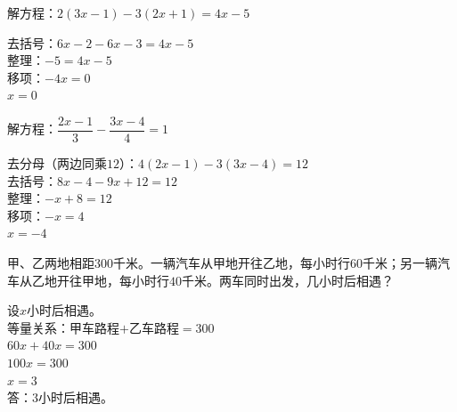\documentclass[a4paper,12pt]{ctexart}
\begin{document}

\begin{example}
解方程：$2(3x-1)-3(2x+1)=4x-5$
\end{example}
\begin{solution}
去括号：$6x-2-6x-3=4x-5$\\
整理：$-5=4x-5$\\
移项：$-4x=0$\\
$x=0$
\end{solution}

\begin{example}
解方程：$\dfrac{2x-1}{3}-\dfrac{3x-4}{4}=1$
\end{example}
\begin{solution}
去分母（两边同乘$12$）：$4(2x-1)-3(3x-4)=12$\\
去括号：$8x-4-9x+12=12$\\
整理：$-x+8=12$\\
移项：$-x=4$\\
$x=-4$
\end{solution}



\begin{example}
甲、乙两地相距$300$千米。一辆汽车从甲地开往乙地，每小时行$60$千米；另一辆汽车从乙地开往甲地，每小时行$40$千米。两车同时出发，几小时后相遇？
\end{example}
\begin{solution}
设$x$小时后相遇。\\
等量关系：甲车路程$+$乙车路程$=300$\\
$60x+40x=300$\\
$100x=300$\\
$x=3$\\
答：$3$小时后相遇。
\end{solution}

\end{document}
